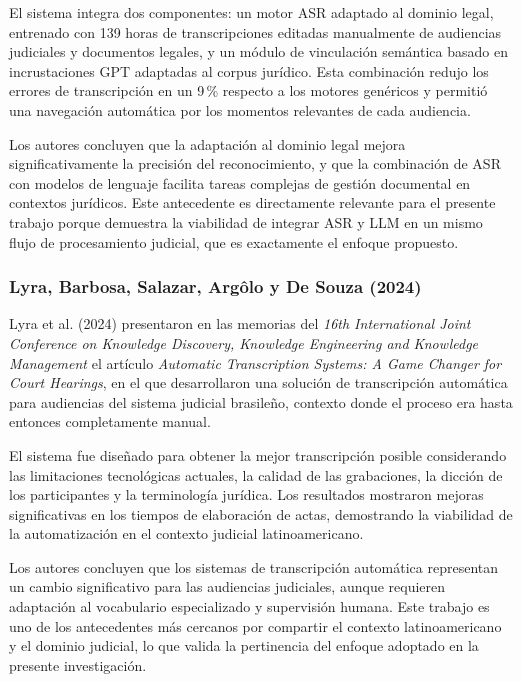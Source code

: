 \documentclass[12pt,a4paper,oneside]{article}
\begin{document}
El sistema integra dos componentes: un motor ASR adaptado al dominio legal, entrenado con 139 horas de transcripciones editadas manualmente de audiencias judiciales y documentos legales, y un m\'odulo de vinculaci\'on sem\'antica basado en incrustaciones GPT adaptadas al corpus jur\'idico. Esta combinaci\'on redujo los errores de transcripci\'on en un 9\,\% respecto a los motores gen\'ericos y permiti\'o una navegaci\'on autom\'atica por los momentos relevantes de cada audiencia.

Los autores concluyen que la adaptaci\'on al dominio legal mejora significativamente la precisi\'on del reconocimiento, y que la combinaci\'on de ASR con modelos de lenguaje facilita tareas complejas de gesti\'on documental en contextos jur\'idicos. Este antecedente es directamente relevante para el presente trabajo porque demuestra la viabilidad de integrar ASR y LLM en un mismo flujo de procesamiento judicial, que es exactamente el enfoque propuesto.

\subsubsection{Lyra, Barbosa, Salazar, Arg\^olo y De Souza (2024)}

Lyra et al. (2024) presentaron en las memorias del \textit{16th International Joint Conference on Knowledge Discovery, Knowledge Engineering and Knowledge Management} el art\'iculo \textit{Automatic Transcription Systems: A Game Changer for Court Hearings}, en el que desarrollaron una soluci\'on de transcripci\'on autom\'atica para audiencias del sistema judicial brasile\~no, contexto donde el proceso era hasta entonces completamente manual.

El sistema fue dise\~nado para obtener la mejor transcripci\'on posible considerando las limitaciones tecnol\'ogicas actuales, la calidad de las grabaciones, la dicci\'on de los participantes y la terminolog\'ia jur\'idica. Los resultados mostraron mejoras significativas en los tiempos de elaboraci\'on de actas, demostrando la viabilidad de la automatizaci\'on en el contexto judicial latinoamericano.

Los autores concluyen que los sistemas de transcripci\'on autom\'atica representan un cambio significativo para las audiencias judiciales, aunque requieren adaptaci\'on al vocabulario especializado y supervisi\'on humana. Este trabajo es uno de los antecedentes m\'as cercanos por compartir el contexto latinoamericano y el dominio judicial, lo que valida la pertinencia del enfoque adoptado en la presente investigaci\'on.
\end{document}
